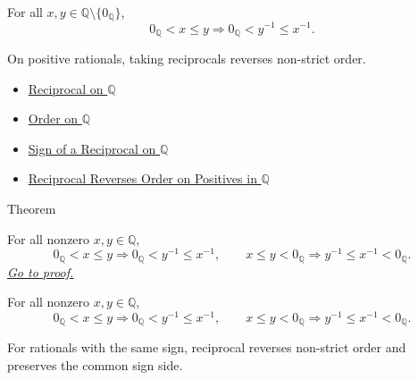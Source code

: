 \begin{remark*}
For all $x,y\in\mathbb{Q}\setminus\{0_{\mathbb{Q}}\}$,
\[
0_{\mathbb{Q}}<x\le y
\Longrightarrow
0_{\mathbb{Q}}<y^{-1}\le x^{-1}.
\]
\end{remark*}

\begin{remark*}[Interpretation]
On positive rationals, taking reciprocals reverses non-strict order.
\end{remark*}

\begin{dependencies}
\begin{itemize}
  \item \hyperref[def:reciprocal-on-q-classes]{Reciprocal on $\mathbb{Q}$}
  \item \hyperref[def:order-on-q]{Order on $\mathbb{Q}$}
  \item \hyperref[thm:sign-of-reciprocal-q]{Sign of a Reciprocal on $\mathbb{Q}$}
  \item \hyperref[thm:reciprocal-reverses-order-on-positives-q]{Reciprocal Reverses Order on Positives in $\mathbb{Q}$}
\end{itemize}
\end{dependencies}

\begin{theorembox}{Theorem}
\begin{theorem}
\label{thm:reciprocal-reverses-nonstrict-order-on-same-sign-q}
For all nonzero $x,y\in\mathbb{Q}$,
\[
0_{\mathbb{Q}}<x\le y
\Longrightarrow
0_{\mathbb{Q}}<y^{-1}\le x^{-1},
\qquad
x\le y<0_{\mathbb{Q}}
\Longrightarrow
y^{-1}\le x^{-1}<0_{\mathbb{Q}}.
\]
\hyperref[prf:reciprocal-reverses-nonstrict-order-on-same-sign-q]{\textit{Go to proof.}}
\end{theorem}
\end{theorembox}

\begin{remark*}
For all nonzero $x,y\in\mathbb{Q}$,
\[
0_{\mathbb{Q}}<x\le y
\Longrightarrow
0_{\mathbb{Q}}<y^{-1}\le x^{-1},
\qquad
x\le y<0_{\mathbb{Q}}
\Longrightarrow
y^{-1}\le x^{-1}<0_{\mathbb{Q}}.
\]
\end{remark*}

\begin{remark*}[Interpretation]
For rationals with the same sign, reciprocal reverses non-strict order and
preserves the common sign side.
\end{remark*}

